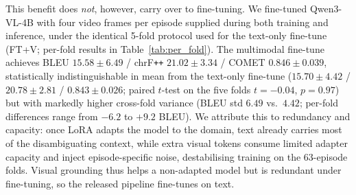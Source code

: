 \documentclass[journal]{IEEEtran}
\begin{document}
This benefit does \emph{not}, however, carry over to fine-tuning.
We fine-tuned Qwen3-VL-4B with four video frames per episode supplied during both training and inference, under the identical 5-fold protocol used for the text-only fine-tune (FT+V; per-fold results in Table~\ref{tab:per_fold}).
The multimodal fine-tune achieves BLEU $15.58\pm6.49$ / chrF\texttt{++} $21.02\pm3.34$ / COMET $0.846\pm0.039$, statistically indistinguishable in mean from the text-only fine-tune ($15.70\pm4.42$ / $20.78\pm2.81$ / $0.843\pm0.026$; paired $t$-test on the five folds $t=-0.04$, $p=0.97$) but with markedly higher cross-fold variance (BLEU std $6.49$ vs.\ $4.42$; per-fold differences range from $-6.2$ to $+9.2$ BLEU).
We attribute this to redundancy and capacity: once LoRA adapts the model to the domain, text already carries most of the disambiguating context, while extra visual tokens consume limited adapter capacity and inject episode-specific noise, destabilising training on the 63-episode folds.
Visual grounding thus helps a non-adapted model but is redundant under fine-tuning, so the released pipeline fine-tunes on text.
\end{document}

